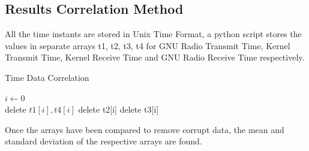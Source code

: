 \subsection{Results Correlation Method}
All the time instants are stored in Unix Time Format, a python script stores the values in separate arrays t1, t2, t3, t4 for GNU Radio Transmit Time, Kernel Transmit Time, Kernel Receive Time and GNU Radio Receive Time respectively. 

\begin{algorithm}[!h]
\caption{Time Data Correlation}
\begin{algorithmic}
\State $i \gets 0$
 \\
\hspace{1.35cm} delete $t1[i],t4[i]$
delete t2[i]
delete t3[i] 
\EndIf
\EndFor
\end{algorithmic}
\end{algorithm}

Once the arrays have been compared to remove corrupt data, the mean and standard deviation of the respective arrays are found.
